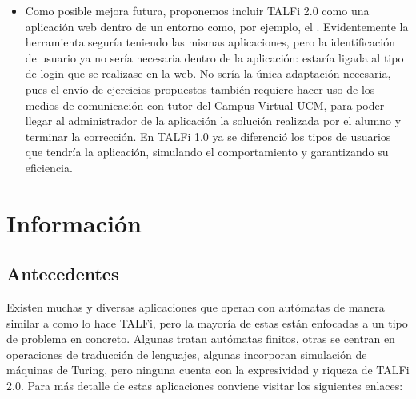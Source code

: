 \documentclass[12pt,a4paper,spanish]{book}
\newcommand{\clearemptydoublepage}{\newpage{\pagestyle{empty}
\cleardoublepage}}
\begin{document}
\begin{itemize}
\begin{itemize}
Para cerrar de manera final la minimizaci\'on se imprime en un archivo html de forma detallada las tablas que se generan en este algoritmo para que quedasen m\'as claros los pasos que se van realizando.
\item TALFi 1.0 diferenciaba entre ejercicios y ejemplos, pero era posible ver la soluci\'on de un ejercicio propuesto por el profesor, si lo abr\'iamos como ejemplo. Este comportamiento no nos pareci\'o muy adecuado debido al car\'acter docente y de aprendizaje de TALFi. Dicho comportamiento fue subsanado, adem\'as de incluir mayor n\'umero de ejemplos y ejercicios.
\item Inclusi\'on de un modo \LaTeX{} con el que podemos obtener en dicho formato, tanto los aut\'omatas que se creen en TALFi, como los ejemplos, as\'i como la simplificaci\'on de las gram\'aticas anteriormente mencionadas.\\
\end{itemize}
\item Como posible mejora futura, proponemos incluir TALFi 2.0 como una aplicaci\'on web dentro de un entorno como, por ejemplo, el . Evidentemente la herramienta segur\'ia teniendo las mismas aplicaciones, pero la identificaci\'on de usuario ya no ser\'ia necesaria dentro de la aplicaci\'on: estar\'ia ligada al tipo de login que se realizase en la web.
No ser\'ia la \'unica adaptaci\'on necesaria, pues el env\'io de ejercicios propuestos tambi\'en requiere hacer uso de los medios de comunicaci\'on con tutor del Campus Virtual UCM, para poder llegar al administrador de la aplicaci\'on la soluci\'on realizada por el alumno y terminar la correcci\'on.
En TALFi 1.0 ya se diferenci\'o los tipos de usuarios que tendr\'ia la aplicaci\'on, simulando el comportamiento y garantizando su eficiencia.
\end{itemize}

\clearemptydoublepage
\chapter{Informaci\'on}
\section{Antecedentes}
Existen muchas y diversas aplicaciones que operan con aut\'omatas de manera similar a como lo hace TALFi, pero la mayor\'ia de estas est\'an enfocadas a un tipo de problema en concreto.
Algunas tratan aut\'omatas finitos, otras se centran en operaciones de traducci\'on de lenguajes, algunas incorporan simulaci\'on de m\'aquinas de Turing, pero ninguna cuenta con la expresividad y riqueza de TALFi 2.0.
Para m\'as detalle de estas aplicaciones conviene visitar los siguientes enlaces:
\newline
\end{document}

